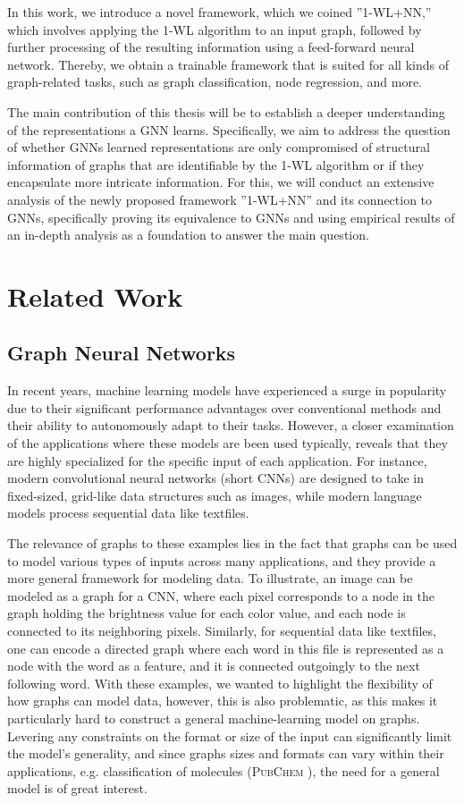 \documentclass[11pt, dvipsnames, DIV=12]{scrreprt}
\theoremstyle{definition}
\begin{document}
In this work, we introduce a novel framework, which we coined ''1-WL+NN,'' which involves applying the 1-WL algorithm to an input graph, followed by further processing of the resulting information using a feed-forward neural network. Thereby, we obtain a trainable framework that is suited for all kinds of graph-related tasks, such as graph classification, node regression, and more.

The main contribution of this thesis will be to establish a deeper understanding of the representations a GNN learns. Specifically, we aim to address the question of whether GNNs learned representations are only compromised of structural information of graphs that are identifiable by the 1-WL algorithm or if they encapsulate more intricate information.
For this, we will conduct an extensive analysis of the newly proposed framework ''1-WL+NN'' and its connection to GNNs, specifically proving its equivalence to GNNs and using empirical results of an in-depth analysis as a foundation to answer the main question.

\section{Related Work}
\subsection{Graph Neural Networks}
In recent years, machine learning models have experienced a surge in popularity due to their significant performance advantages over conventional methods and their ability to autonomously adapt to their tasks. However, a closer examination of the applications where these models are been used typically, reveals that they are highly specialized for the specific input of each application. For instance, modern convolutional neural networks (short CNNs) are designed to take in fixed-sized, grid-like data structures such as images, while modern language models process sequential data like textfiles.

The relevance of graphs to these examples lies in the fact that graphs can be used to model various types of inputs across many applications, and they provide a more general framework for modeling data. To illustrate, an image can be modeled as a graph for a CNN, where each pixel corresponds to a node in the graph holding the brightness value for each color value, and each node is connected to its neighboring pixels. Similarly, for sequential data like textfiles, one can encode a directed graph where each word in this file is represented as a node with the word as a feature, and it is connected outgoingly to the next following word. With these examples, we wanted to highlight the flexibility of how graphs can model data, however, this is also problematic, as this makes it particularly hard to construct a general machine-learning model on graphs. Levering any constraints on the format or size of the input can significantly limit the model's generality, and since graphs sizes and formats can vary within their applications, e.g. classification of molecules (\textsc{PubChem} \cite{Mor+2020}), the need for a general model is of great interest.
\end{document}
